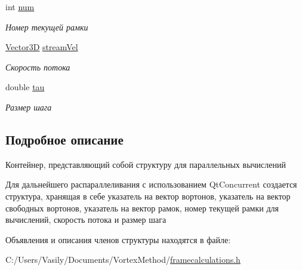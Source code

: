 \begin{DoxyCompactItemize}
int \mbox{\hyperlink{struct_parallel_a03856e8f10a990c5170ba56936c05f29}{num}}
\begin{DoxyCompactList}\small\item\em Номер текущей рамки \end{DoxyCompactList}\item 
\mbox{\label{struct_parallel_aaf9e67ee27a7e48e5089af613bd06b99}} 
\mbox{\hyperlink{class_vector3_d}{Vector3D}} \mbox{\hyperlink{struct_parallel_aaf9e67ee27a7e48e5089af613bd06b99}{stream\+Vel}}
\begin{DoxyCompactList}\small\item\em Скорость потока \end{DoxyCompactList}\item 
\mbox{\label{struct_parallel_a1ec7b4c02517f9d28774593160dd3a31}} 
double \mbox{\hyperlink{struct_parallel_a1ec7b4c02517f9d28774593160dd3a31}{tau}}
\begin{DoxyCompactList}\small\item\em Размер шага \end{DoxyCompactList}\end{DoxyCompactItemize}


\subsection{Подробное описание}
Контейнер, представляющий собой структуру для параллельных вычислений 

Для дальнейшего распараллеливания с использованием Qt\+Concurrent создается структура, хранящая в себе указатель на вектор вортонов, указатель на вектор свободных вортонов, указатель на вектор рамок, номер текущей рамки для вычислений, скорость потока и размер шага 

Объявления и описания членов структуры находятся в файле\+:\begin{DoxyCompactItemize}
\item 
C\+:/\+Users/\+Vasily/\+Documents/\+Vortex\+Method/\mbox{\hyperlink{framecalculations_8h}{framecalculations.\+h}}\end{DoxyCompactItemize}
